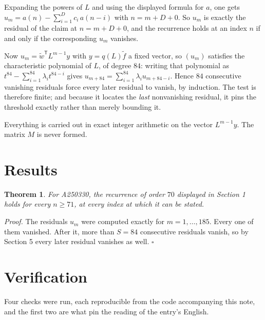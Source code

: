 \documentclass[11pt]{article}
\newtheorem{theorem}{Theorem}
\theoremstyle{definition}
\begin{document}
Expanding the powers of $L$ and using the displayed formula for $a$, one gets $u_m = a(n) - \sum_{i=1}^{D} c_i\,a(n-i)$ with $n = m + D + 0$. So $u_m$ is exactly the residual of the claim at $n = m + D + 0$, and the recurrence holds at an index $n$ if and only if the corresponding $u_m$ vanishes.

Now $u_m = \tilde w^{\mathsf T} L^{m-1} y$ with $y = q(L)\tilde f$ a fixed vector, so $(u_m)$ satisfies the characteristic polynomial of $L$, of degree $84$: writing that polynomial as $t^{84} - \sum_{i=1}^{84} \lambda_i t^{84-i}$ gives $u_{m+84} = \sum_{i=1}^{84} \lambda_i u_{m+84-i}$. Hence $84$ consecutive vanishing residuals force every later residual to vanish, by induction. The test is therefore finite; and because it locates the {\itshape last} nonvanishing residual, it pins the threshold exactly rather than merely bounding it.

Everything is carried out in exact integer arithmetic on the vector $L^{m-1}y$. The matrix $M$ is never formed.

\section{Results}

\begin{theorem} For A250330, the recurrence of order $70$ displayed in Section 1 holds for every $n \ge 71$, at every index at which it can be stated.\end{theorem}

{\itshape Proof.} The residuals $u_m$ were computed exactly for $m = 1,\dots,185$. Every one of them vanished. After it, more than $S = 84$ consecutive residuals vanish, so by Section 5 every later residual vanishes as well. $\square$

\section{Verification}

Four checks were run, each reproducible from the code accompanying this note, and the first two are what pin the reading of the entry's English.
\end{document}
